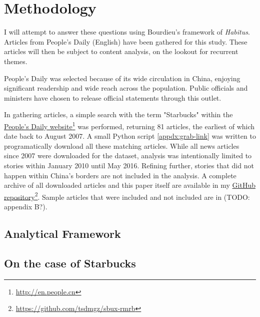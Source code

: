 \chapter{Methodology}\label{sec:methodology}

I will attempt to answer these questions using Bourdieu's framework of
\emph{Habitus}. Articles from People's Daily (English) have been gathered for
this study. These articles will then be subject to content analysis, on the
lookout for recurrent themes.

People's Daily was selected because of its wide circulation in China, enjoying
significant readership and wide reach across the population. Public officials
and ministers have chosen to release official statements through this outlet.

In gathering articles, a simple search with the term "Starbucks" within the
\href{http://en.people.cn}{People's Daily
website}\footnote{\url{http://en.people.cn}} was performed, returning 81
articles, the earliest of which date back to August 2007. A small Python script
\ref{appdx:grab-link} was written to programatically download all these matching
articles. While all news articles since 2007 were downloaded for the dataset,
analysis was intentionally limited to stories within January 2010 until May
2016. Refining further, stories that did not happen within China's borders are
not included in the analysis. A complete archive of all downloaded articles and
this paper itself are available in my
\href{https://github.com/tsdmgz/sbux-rmrb}{GitHub
repository}\footnote{\url{https://github.com/tsdmgz/sbux-rmrb}}. Sample articles
that were included and not included are in (TODO: appendix B?).

\section{Analytical Framework}\label{subs:analyticf}


\section{On the case of Starbucks}\label{subs:case-of-sbux}


